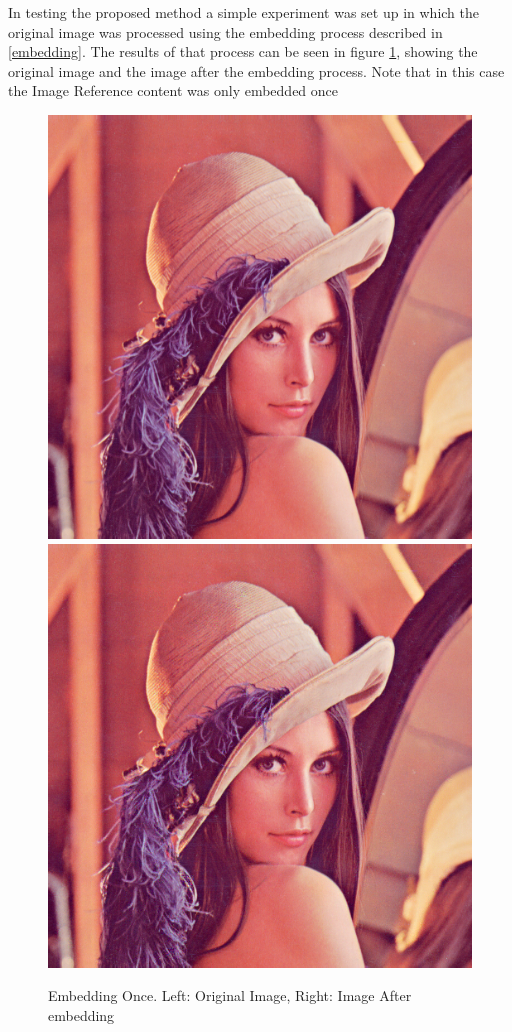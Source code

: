 \documentclass[12pt]{article}
\begin{document}
In testing the proposed method a simple experiment was set up in which the original image was processed using the embedding process described in \ref{embedding}.
The results of that process can be seen in figure \ref{fig:lenaEmbedOnceEmbedding}, showing the original image and the image after the embedding process.
Note that in this case the Image Reference content was only embedded once

\begin{figure}[h]
\centerline{%
\includegraphics[scale=0.45]{"lena"}%
\hspace{0.1cm}
\includegraphics[scale=0.45]{"Lena Embed once 0.7 threshold/finalImage"}%
}%
\caption{Embedding Once. Left: Original Image, Right: Image After embedding}
\label{fig:lenaEmbedOnceEmbedding}
\end{figure}
\end{document}
